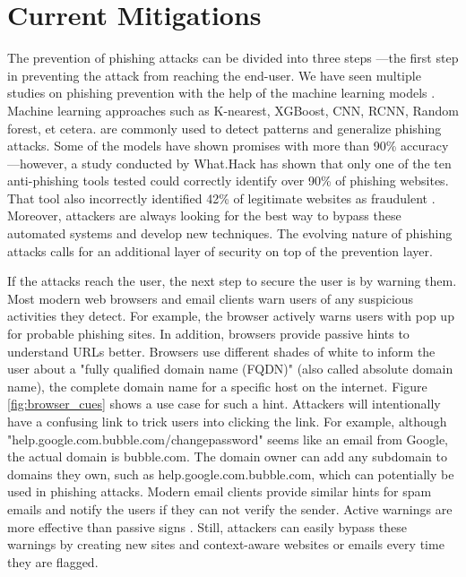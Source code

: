 \section{Current Mitigations}
The prevention of phishing attacks can be divided into three steps \cite{vayansky}—the first step in preventing the attack from reaching the end-user. We have seen multiple studies on phishing prevention with the help of the machine learning models \cite{yang_zheng_wu_wu_wang_2021, sahingoz_buber_demir_diri_2019}. Machine learning approaches such as K-nearest, XGBoost, CNN, RCNN, Random forest, et cetera. are commonly used to detect patterns and generalize phishing attacks. Some of the models have shown promises with more than 90\% accuracy—however, a study conducted by What.Hack has shown that only one of the ten anti-phishing tools tested could correctly identify over 90\% of phishing websites. That tool also incorrectly identified 42\% of legitimate websites as fraudulent \cite{what_hack}. Moreover, attackers are always looking for the best way to bypass these automated systems and develop new techniques. The evolving nature of phishing attacks calls for an additional layer of security on top of the prevention layer.

If the attacks reach the user, the next step to secure the user is by warning them. Most modern web browsers and email clients warn users of any suspicious activities they detect. For example, the browser actively warns users with pop up for probable phishing sites. In addition, browsers provide passive hints to understand URLs better. Browsers use different shades of white to inform the user about a "fully qualified domain name (FQDN)" (also called absolute domain name), the complete domain name for a specific host on the internet. Figure \ref*{fig:browser_cues} shows a use case for such a hint. Attackers will intentionally have a confusing link to trick users into clicking the link. For example, although "help.google.com.bubble.com/changepassword" seems like an email from Google, the actual domain is bubble.com. The domain owner can add any subdomain to domains they own, such as help.google.com.bubble.com, which can potentially be used in phishing attacks. Modern email clients provide similar hints for spam emails and notify the users if they can not verify the sender. Active warnings are more effective than passive signs \cite{vayansky}. Still, attackers can easily bypass these warnings by creating new sites and context-aware websites or emails every time they are flagged.

